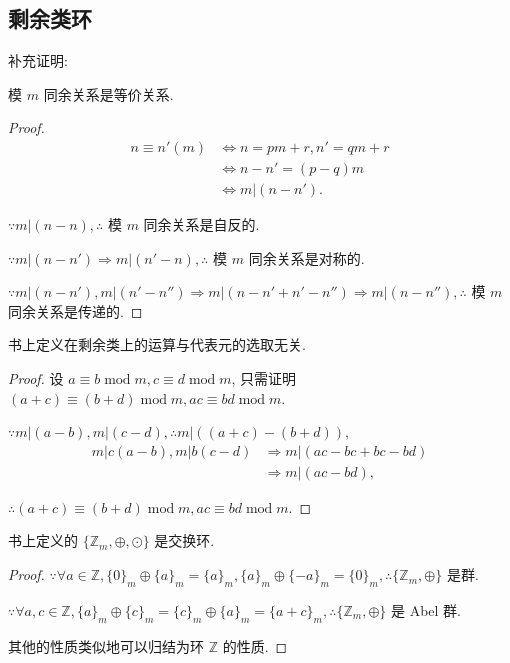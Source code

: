 \documentclass{ctexart}
\begin{document}
\subsection{剩余类环}
补充证明:
\begin{theorem}
    模 $m$ 同余关系是等价关系.
\end{theorem}
\begin{proof}
    \begin{align*}
        n\equiv n'(m) & \Leftrightarrow n=pm+r,n'=qm+r \\
        & \Leftrightarrow n-n'=(p-q)m \\
        & \Leftrightarrow m|(n-n').
    \end{align*}

    $\because m|(n-n),\therefore$ 模 $m$ 同余关系是自反的.

    $\because m|(n-n')\Rightarrow m|(n'-n),\therefore$ 模 $m$ 同余关系是对称的.

    $\because m|(n-n'),m|(n'-n'')\Rightarrow m|(n-n'+n'-n'')\Rightarrow m|(n-n''),\therefore$ 模 $m$ 同余关系是传递的.
\end{proof}
\begin{theorem}
    书上定义在剩余类上的运算与代表元的选取无关.
\end{theorem}
\begin{proof}
    设 $a\equiv b\operatorname{mod}m,c\equiv d\operatorname{mod}m$, 只需证明 $(a+c)\equiv(b+d)\operatorname{mod}m,ac\equiv bd\operatorname{mod}m$.

    $\because m|(a-b),m|(c-d),\therefore m|((a+c)-(b+d))$,
    \begin{align*}
        m|c(a-b),m|b(c-d) & \Rightarrow m|(ac-bc+bc-bd) \\
        & \Rightarrow m|(ac-bd),
    \end{align*}

    $\therefore (a+c)\equiv(b+d)\operatorname{mod}m,ac\equiv bd\operatorname{mod}m$.
\end{proof}
\begin{theorem}
    书上定义的 $\{\mathbb{Z}_m,\oplus,\odot\}$ 是交换环.
\end{theorem}
\begin{proof}
    $\because\forall a\in\mathbb{Z},\{0\}_m\oplus\{a\}_m=\{a\}_m,\{a\}_m\oplus\{-a\}_m=\{0\}_m,\therefore\{\mathbb{Z}_m,\oplus\}$ 是群.

    $\because\forall a,c\in\mathbb{Z},\{a\}_m\oplus\{c\}_m=\{c\}_m\oplus\{a\}_m=\{a+c\}_m,\therefore\{\mathbb{Z}_m,\oplus\}$ 是 Abel 群.

    其他的性质类似地可以归结为环 $\mathbb{Z}$ 的性质.
\end{proof}
\end{document}

